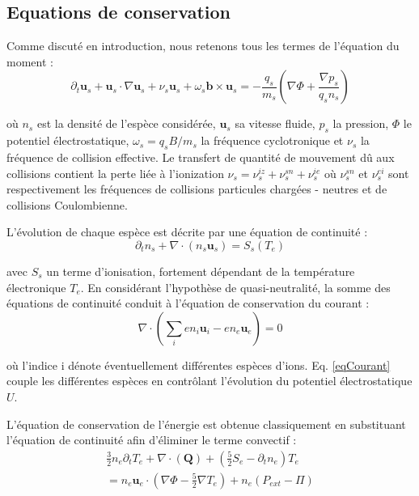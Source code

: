 \subsection{Equations de conservation}
Comme discuté en introduction, nous retenons tous les termes de l'équation du
moment :
\begin{equation}
\partial_t \mathbf{u}_s + \mathbf{u}_s\cdot\nabla\mathbf{u}_s+
\nu_s\mathbf{u}_s+\omega_s\mathbf{b}\times\mathbf{u}_s=
-\frac{q_s}{m_s}\left(\nabla \Phi+\frac{\nabla p_s}{q_sn_s}\right)
\end{equation}

où $n_s$ est la densité de l'espèce considérée, $\mathbf{u}_s$ sa vitesse
fluide, $p_s$ la pression, $\Phi$ le potentiel électrostatique,
$\omega_s=q_sB/m_s$ la fréquence cyclotronique et $\nu_s$ la fréquence de collision effective.
Le transfert de quantité de mouvement dû aux collisions contient la perte liée à
l'ionization $\nu_s=\nu_{s}^{iz}+\nu_{s}^{sn}+\nu_{s}^{ie}$ où $\nu_{s}^{sn}$ et
$\nu_{s}^{ei}$ sont respectivement les fréquences de collisions particules
chargées - neutres et de collisions Coulombienne.

L'évolution de chaque espèce est décrite par une équation de continuité :
\begin{equation}
\label{3-continuite}
\partial_t n_s + \nabla\cdot\left(n_s\mathbf{u}_s\right)=S_s(T_e)
\end{equation}

avec $S_s$ un terme d'ionisation, fortement dépendant de la
température électronique $T_e$. En considérant l'hypothèse de quasi-neutralité, la somme des
équations de continuité conduit à l'équation de conservation du courant :
\begin{equation}
\label{eqCourant}
\nabla\cdot(\sum_ien_i\mathbf{u}_i-en_e\mathbf{u}_e)=0
\end{equation}

où l'indice i dénote éventuellement différentes espèces d'ions. Eq.
\ref{eqCourant} couple les différentes espèces en contrôlant l'évolution du potentiel électrostatique $U$.

L'équation de conservation de l'énergie est obtenue classiquement en substituant
l'équation de continuité afin d'éliminer le terme convectif :
\begin{equation}\begin{split}
\label{3-energie}
\frac{3}{2}n_e\partial_tT_e + \nabla\cdot(\mathbf{Q}) +
(\frac{5}{2}S_e-\partial_tn_e)T_e \\=n_e\mathbf{u}_e\cdot(\nabla
\Phi-\frac{5}{2}\nabla T_e)+n_e\left(P_{ext}-\Pi\right)
\end{split}
\end{equation}

